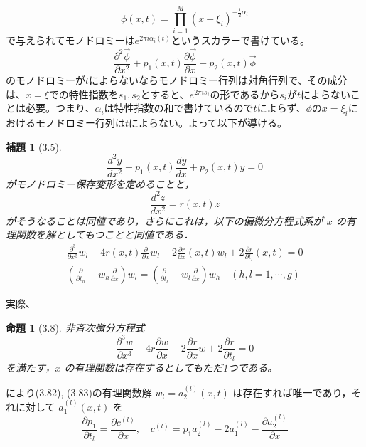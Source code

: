 \documentclass[paper=a4, fontsize=11pt]{jlreq} %
\newenvironment{story}{%
  \begin{mdframed}[
    backgroundcolor=red!5, %
    linewidth=0pt,         %
    innertopmargin=10pt,   %
    innerbottommargin=10pt,
    innerrightmargin=10pt, %
    innerleftmargin=10pt
  ]%
}{%
  \end{mdframed}%
}
\theoremstyle{break}
\newtheorem{proposition}[theorem]{命題}
\newtheorem{lemma}[theorem]{補題}
\theoremstyle{qa}
\begin{document}
\[
\phi(x,t)=\prod_{i=1}^{M}(x-\xi_{i})^{-\frac{1}{2}\alpha_{i}}
\]
で与えられてモノドロミーは$e^{2\pi i\alpha_{i}(t)}$というスカラーで書けている。
\[
\frac{\partial^{2}\vec{\phi}}{\partial x^{2}} + p_{1}(x,t)\frac{\partial\vec{\phi}}{\partial x}+p_{2}(x,t)\vec{\phi}
\]
のモノドロミーが$t$によらないならモノドロミー行列は対角行列で、その成分は、$x=\xi$での特性指数を$s_{1},s_{2}$とすると、$e^{2\pi is_{i}}$の形であるから$s_{i}$が$t$によらないことは必要。つまり、$\alpha_{i}$は特性指数の和で書けているので$t$によらず、$\phi$の$x=\xi_{i}$におけるモノドロミー行列は$t$によらない。よって以下が導ける。
\begin{story}
\begin{lemma}[3.5]
\begin{equation}
    \frac{d^2 y}{dx^2} + p_1(x,t)\frac{dy}{dx} + p_2(x,t)y = 0 \label{eq:3.33}
\end{equation}
がモノドロミー保存変形を定めることと，
\begin{equation}
    \frac{d^2 z}{dx^2} = r(x,t)z \label{eq:3.25}
\end{equation}
がそうなることは同値であり，さらにこれは，以下の偏微分方程式系が $x$ の有理関数を解としてもつことと同値である．
\begin{align}
    \frac{\partial^3}{\partial x^3}w_l - 4r(x,t)\frac{\partial}{\partial x}w_l - 2\frac{\partial r}{\partial x}(x,t)w_l + 2\frac{\partial r}{\partial t_l}(x,t) = 0 \label{eq:3.82} \\
    \left( \frac{\partial}{\partial t_h} - w_h \frac{\partial}{\partial x} \right) w_l = \left( \frac{\partial}{\partial t_l} - w_l \frac{\partial}{\partial x} \right) w_h \quad (h,l = 1,\cdots,g) \label{eq:3.83}
\end{align}
\end{lemma}
実際、
\begin{proposition}[3.8]
非斉次微分方程式
\begin{equation}
    \frac{\partial^3 w}{\partial x^3} - 4r\frac{\partial w}{\partial x} - 2\frac{\partial r}{\partial x}w + 2\frac{\partial r}{\partial t_l} = 0 \label{eq:3.29}
\end{equation}
を満たす，$x$ の有理関数は存在するとしてもただ1つである。
\end{proposition}
により(3.82), (3.83)の有理関数解 $w_l = a_2^{(l)}(x,t)$ は存在すれば唯一であり，それに対して $a_1^{(l)}(x,t)$ を
\begin{equation}
    \frac{\partial p_1}{\partial t_l} = \frac{\partial c^{(l)}}{\partial x}, \quad c^{(l)} = p_1 a_2^{(l)} - 2a_1^{(l)} - \frac{\partial a_2^{(l)}}{\partial x} \label{eq:3.23}

\end{equation}
\end{story}
\end{document}
